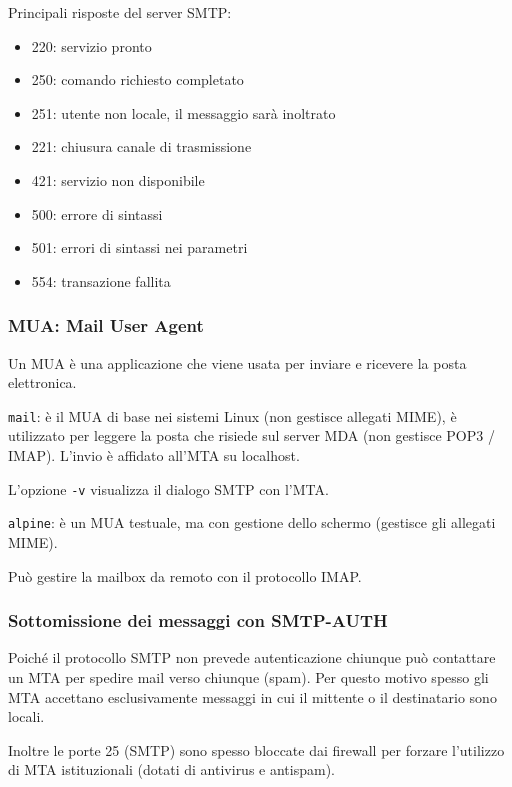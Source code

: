         Principali risposte del server SMTP:
        \begin{itemize}
            \item 220: servizio pronto
            \item 250: comando richiesto completato
            \item 251: utente non locale, il messaggio sarà inoltrato
            \item 221: chiusura canale di trasmissione
            \item 421: servizio non disponibile
            \item 500: errore di sintassi
            \item 501: errori di sintassi nei parametri
            \item 554: transazione fallita
        \end{itemize}

        \subsubsection{MUA: Mail User Agent}
            Un MUA è una applicazione che viene usata per inviare e ricevere la posta elettronica.
        
            \verb:mail:: è il MUA di base nei sistemi Linux (non gestisce allegati MIME), è utilizzato per leggere la posta che risiede sul server MDA (non gestisce POP3 / IMAP). L'invio è affidato all'MTA su localhost.
        
            L'opzione \verb:-v: visualizza il dialogo SMTP con l'MTA.
        
            \verb:alpine:: è un MUA testuale, ma con gestione dello schermo (gestisce gli allegati MIME).
        
            Può gestire la mailbox da remoto con il protocollo IMAP.

        \subsubsection{Sottomissione dei messaggi con SMTP-AUTH}
            Poiché il protocollo SMTP non prevede autenticazione chiunque può contattare un MTA per spedire mail verso chiunque (spam). Per questo motivo spesso gli MTA accettano esclusivamente messaggi in cui il mittente o il destinatario sono locali.
        
            Inoltre le porte 25 (SMTP) sono spesso bloccate dai firewall per forzare l'utilizzo di MTA istituzionali (dotati di antivirus e antispam).
        
